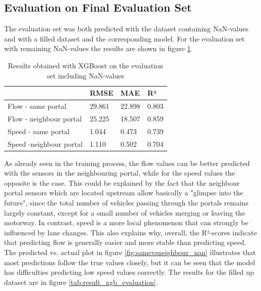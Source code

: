 	\subsection{Evaluation on Final Evaluation Set} 
	The evaluation set was both predicted with the dataset containing NaN-values and with a filled dataset and the corresponding model. 
	For the evaluation set with remaining NaN-values the results are shown in figure \ref{tab:result_xgb_evaluation_nan}.
	\begin{table}[H]
		\centering
		\caption{Results obtained with XGBoost on the evaluation set including NaN-values}
		\label{tab:result_xgb_evaluation_nan}
		\begin{tabular}{l|lll}
			& RMSE   & MAE    & R²    \\
			\hline
			Flow - same portal      & 29.861 & 22.898& 0.803\\
			Flow - neighbour portal  &25.225& 18.507& 0.859\\
			Speed - same portal     & 1.044& 0.473& 0.739\\
			Speed -neighbour portal & 1.110& 0.502& 0.704
		\end{tabular}
	\end{table}
	\noindent As already seen in the training process, the flow values can be better predicted with the sensors in the neighbouring portal, while for the speed values the opposite is the case. This could be explained by the fact that the neighbour portal sensors which are located upstream allow basically a "glimpse into the future", since the total number of vehicles passing through the portals remains largely constant, except for a small number of vehicles merging or leaving the motorway. In contrast, speed is a more local phenomenon that can strongly be influenced by lane changes. This also explains why, overall, the R²-scores indicate that predicting flow is generally easier and more stable than predicting speed.\newline 
	The predicted vs. actual plot in figure \ref{fig:samevsneighbour_nan} illustrates that most predictions follow the true values closely, but it can be seen that the model has difficulties predicting low speed values correctly. 
	The results for the filled up dataset are in figure \ref{tab:result_xgb_evaluation}.
